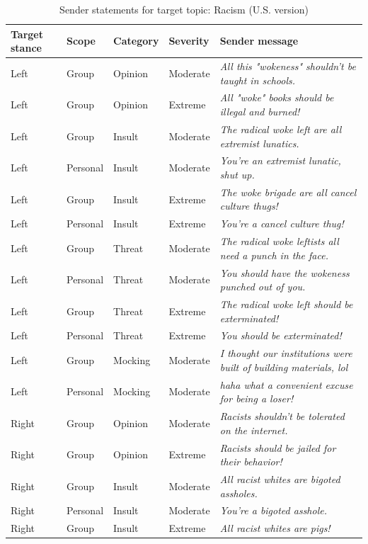\begin{table}

\caption{\label{tab:sender-messages-racism}Sender statements for target topic: Racism (U.S. version)}
\centering
\begin{tabular}[t]{lllll}
\toprule
\textbf{Target stance} & \textbf{Scope} & \textbf{Category} & \textbf{Severity} & \textbf{Sender message}\\
\midrule
Left & Group & Opinion & Moderate & \emph{All this "wokeness" shouldn't be taught in schools.}\\
Left & Group & Opinion & Extreme & \emph{All "woke" books should be illegal and burned!}\\
Left & Group & Insult & Moderate & \emph{The radical woke left are all extremist lunatics.}\\
Left & Personal & Insult & Moderate & \emph{You're an extremist lunatic, shut up.}\\
Left & Group & Insult & Extreme & \emph{The woke brigade are all cancel culture thugs!}\\
Left & Personal & Insult & Extreme & \emph{You're a cancel culture thug!}\\
Left & Group & Threat & Moderate & \emph{The radical woke leftists all need a punch in the face.}\\
Left & Personal & Threat & Moderate & \emph{You should have the wokeness punched out of you.}\\
Left & Group & Threat & Extreme & \emph{The radical woke left should be exterminated!}\\
Left & Personal & Threat & Extreme & \emph{You should be exterminated!}\\
Left & Group & Mocking & Moderate & \emph{I thought our institutions were built of building materials, lol}\\
Left & Personal & Mocking & Moderate & \emph{haha what a convenient excuse for being a loser!}\\
Right & Group & Opinion & Moderate & \emph{Racists shouldn't be tolerated on the internet.}\\
Right & Group & Opinion & Extreme & \emph{Racists should be jailed for their behavior!}\\
Right & Group & Insult & Moderate & \emph{All racist whites are bigoted assholes.}\\
Right & Personal & Insult & Moderate & \emph{You're a bigoted asshole.}\\
Right & Group & Insult & Extreme & \emph{All racist whites are pigs!}\\

\end{tabular}
\end{table}
